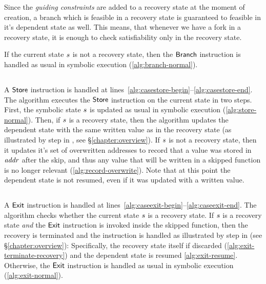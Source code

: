 Since the \textit{guiding constraints} are added to a recovery state at the moment of creation,
a branch which is feasible in a recovery state is guaranteed to feasible in it's dependent state as well.
This means, that whenever we have a fork in a recovery state,
it is enough to check satisfiability only in the recovery state.

If the current state $s$ is not a recovery
state, then the $\mathsf{Branch}$ instruction is handled as usual in
symbolic execution (\cref{alg:branch-normal}).

\subsection{}
A $\mathsf{Store}$ instruction is handled
at lines~\ref{alg:casestore-begin}--\ref{alg:casestore-end}.
The algorithm executes the $\mathsf{Store}$ instruction on the
current state in two steps.
First, the symbolic state $s$ is updated as usual in symbolic execution (\cref{alg:store-normal}).
Then, if $s$ is a recovery state, then the algorithm
updates the dependent state with the same written value as in the recovery state
(as illustrated by step  in , see \S\ref{chapter:overview}).
If $s$ is not a recovery state,
then it updates it's set of overwritten addresses to record
that a value was stored in $\mathit{addr}$ after the skip,
and thus any value that will be written in a skipped function
is no longer relevant (\cref{alg:record-overwrite}). 
Note that at this point the dependent state is not resumed,
even if it was updated with a written value.

\subsection{}
A $\mathsf{Exit}$ instruction is handled
at lines~\ref{alg:caseexit-begin}--\ref{alg:caseexit-end}.
The algorithm checks whether the current state $s$ is a
recovery state. If $s$ is a recovery state \emph{and} the
$\mathsf{Exit}$ instruction is invoked inside the skipped function,
then the recovery is terminated and the instruction is handled as
illustrated by step  in  (see
\S\ref{chapter:overview}): Specifically, the recovery state itself if
discarded (\cref{alg:exit-terminate-recovery}) and the dependent state
is resumed \cref{alg:exit-resume}. Otherwise, the $\mathsf{Exit}$
instruction is handled as usual in symbolic execution
(\cref{alg:exit-normal}).



